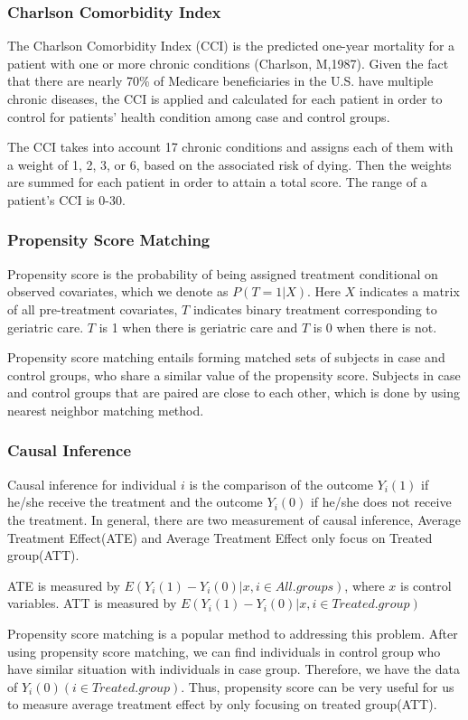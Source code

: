 \documentclass{article}
\begin{document}
	\subsubsection{Charlson Comorbidity Index}
	The Charlson Comorbidity Index (CCI) is the predicted one-year mortality for a patient with one or more chronic conditions (Charlson, M,1987). Given the fact that there are nearly 70\% of Medicare beneficiaries in the U.S. have multiple chronic diseases, the CCI is applied and calculated for each patient in order to control for patients’ health condition among case and control groups. 
	
	The CCI takes into account 17 chronic conditions and assigns each of them with a weight of 1, 2, 3, or 6, based on the associated risk of dying. Then the weights are summed for each patient in order to attain a total score. The range of a patient’s CCI is 0-30.
	
	\subsubsection{Propensity Score Matching}
	Propensity score is the probability of being assigned treatment conditional on observed covariates, which we denote as $P(T=1|X)$. Here $X$ indicates a matrix of all pre-treatment covariates, $T$ indicates binary treatment corresponding to geriatric care. $T$ is 1 when there is geriatric care and $T$ is 0 when there is not.  
	
	Propensity score matching entails forming matched sets of subjects in case and control groups, who share a similar value of the propensity score. Subjects in case and control groups that are paired are close to each other, which is done by using nearest neighbor matching method.
	
	\subsubsection{Causal Inference}
	Causal inference for individual $i$ is the comparison of the outcome $Y_i(1)$ if he/she receive the treatment and the outcome $Y_i(0)$ if he/she does not receive the treatment. In general, there are two measurement of causal inference, Average Treatment Effect(ATE) and Average Treatment Effect only focus on Treated group(ATT). 
	
	ATE is measured by $E(Y_i(1)-Y_i(0)|x,i\in All.groups)$, where $x$ is control variables. ATT is measured by $E(Y_i(1)-Y_i(0)|x,i\in Treated.group)$ 
	
	Propensity score matching is a popular method to addressing this problem. After using propensity score matching, we can find individuals in control group who have similar situation with individuals in case group. Therefore, we have the data of $Y_i(0)(i \in Treated.group)$. Thus, propensity score can be very useful for us to measure average treatment effect by only focusing on treated group(ATT).
\end{document}
